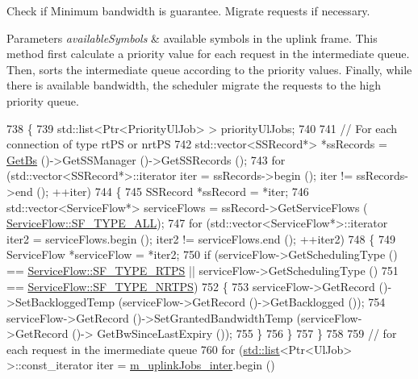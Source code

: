 Check if Minimum bandwidth is guarantee. Migrate requests if necessary. 


\begin{DoxyParams}{Parameters}
{\em available\+Symbols} & available symbols in the uplink frame. This method first calculate a priority value for each request in the intermediate queue. Then, sorts the intermediate queue according to the priority values. Finally, while there is available bandwidth, the scheduler migrate the requests to the high priority queue. \\
\hline
\end{DoxyParams}

\begin{DoxyCode}
738 \{
739   std::list<Ptr<PriorityUlJob> > priorityUlJobs;
740 
741   \textcolor{comment}{// For each connection of type rtPS or nrtPS}
742   std::vector<SSRecord*> *ssRecords = \hyperlink{classns3_1_1UplinkScheduler_afe61b7de71d92d2dff1b135744a6ff7e}{GetBs} ()->GetSSManager ()->GetSSRecords ();
743   \textcolor{keywordflow}{for} (std::vector<SSRecord*>::iterator iter = ssRecords->begin (); iter != ssRecords->end (); ++iter)
744     \{
745       SSRecord *ssRecord = *iter;
746       std::vector<ServiceFlow*> serviceFlows = ssRecord->GetServiceFlows (
      \hyperlink{classns3_1_1ServiceFlow_a7990ba10be1e098328fd1e6382a26235aaf7e58e43027cc9d351cd100a9d6dee3}{ServiceFlow::SF\_TYPE\_ALL});
747       \textcolor{keywordflow}{for} (std::vector<ServiceFlow*>::iterator iter2 = serviceFlows.begin (); iter2 != serviceFlows.end ();
       ++iter2)
748         \{
749           ServiceFlow *serviceFlow = *iter2;
750           \textcolor{keywordflow}{if} (serviceFlow->GetSchedulingType () == \hyperlink{classns3_1_1ServiceFlow_a7990ba10be1e098328fd1e6382a26235a0e98ff713b932a029acad7e5b24bbf55}{ServiceFlow::SF\_TYPE\_RTPS} || 
      serviceFlow->GetSchedulingType ()
751               == \hyperlink{classns3_1_1ServiceFlow_a7990ba10be1e098328fd1e6382a26235a7f8577f851a9f01d159442a3a3fcdf48}{ServiceFlow::SF\_TYPE\_NRTPS})
752             \{
753               serviceFlow->GetRecord ()->SetBackloggedTemp (serviceFlow->GetRecord ()->GetBacklogged ());
754               serviceFlow->GetRecord ()->SetGrantedBandwidthTemp (serviceFlow->GetRecord ()->
      GetBwSinceLastExpiry ());
755             \}
756         \}
757     \}
758 
759   \textcolor{comment}{// for each request in the imermediate queue}
760   \textcolor{keywordflow}{for} (\hyperlink{openflow-interface_8h_afd9bcfa176617760671b67580f536fa7}{std::list}<Ptr<UlJob> >::const\_iterator iter = \hyperlink{classns3_1_1UplinkSchedulerMBQoS_a70eef7c9cb6dad5e71a2105e07d1ec69}{m\_uplinkJobs\_inter}.begin ()

\end{DoxyCode}
